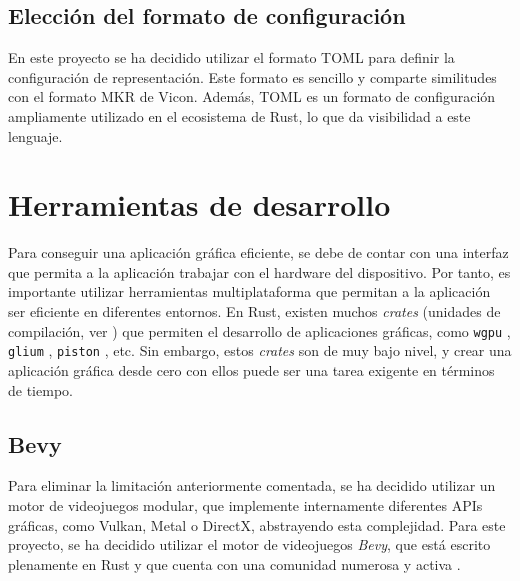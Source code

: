 
\subsection{Elección del formato de configuración}

En este proyecto se ha decidido utilizar el formato \ac{TOML} para definir la configuración de representación. Este formato es sencillo y comparte similitudes con el formato MKR de Vicon. Además, \ac{TOML} es un formato de configuración ampliamente utilizado en el ecosistema de Rust, lo que da visibilidad a este lenguaje.

\section{Herramientas de desarrollo}
Para conseguir una aplicación gráfica eficiente, se debe de contar con una interfaz que permita a la aplicación trabajar con el hardware del dispositivo. Por tanto, es importante utilizar herramientas multiplataforma que permitan a la aplicación ser eficiente en diferentes entornos. En Rust, existen muchos \textit{crates} (unidades de compilación, ver \autocite{PackagesCratesRust}) que permiten el desarrollo de aplicaciones gráficas, como \texttt{wgpu} \autocite{WgpuPortableGraphics}, \texttt{glium} \autocite{GliumGlium2025}, \texttt{piston} \autocite{PistonModularOpen}, etc. Sin embargo, estos \textit{crates} son de muy bajo nivel, y crear una aplicación gráfica desde cero con ellos puede ser una tarea exigente en términos de tiempo. 

\subsection{Bevy} \label{subsec:bevy}
Para eliminar la limitación anteriormente comentada, se ha decidido utilizar un motor de videojuegos modular, que implemente internamente diferentes APIs gráficas, como Vulkan, Metal o DirectX, abstrayendo esta complejidad. Para este proyecto, se ha decidido utilizar el motor de videojuegos \textit{Bevy}, que está escrito plenamente en Rust y que cuenta con una comunidad numerosa y activa \autocite{BevyEngine}.

